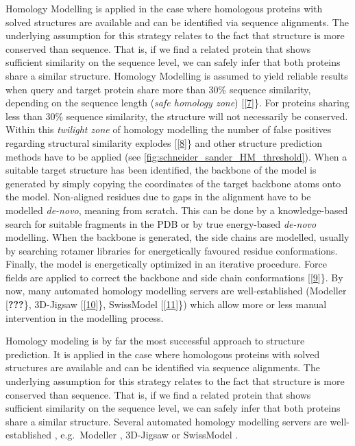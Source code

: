 \documentclass[12pt,a4paper,twoside]{book}
\theoremstyle{definition}
\theoremstyle{definition}
\theoremstyle{remark}
\begin{document}
Homology Modelling is applied in the case where homologous proteins with
solved structures are available and can be identified via sequence
alignments. The underlying assumption for this strategy relates to the
fact that structure is more conserved than sequence. That is, if we find
a related protein that shows sufficient similarity on the sequence
level, we can safely infer that both proteins share a similar structure.
Homology Modelling is assumed to yield reliable results when query and
target protein share more than 30\% sequence similarity, depending on
the sequence length (\textit{safe homology zone})
{[}{[}\protect\hyperlink{ref-Sander1991}{7}{]}\}. For proteins sharing
less than 30\% sequence similarity, the structure will not necessarily
be conserved. Within this \textit{twilight zone} of homology modelling
the number of false positives regarding structural similarity explodes
{[}{[}\protect\hyperlink{ref-Rost1999}{8}{]}\} and other structure
prediction methods have to be applied (see
\autoref{fig:schneider_sander_HM_threshold}). When a suitable target
structure has been identified, the backbone of the model is generated by
simply copying the coordinates of the target backbone atoms onto the
model. Non-aligned residues due to gaps in the alignment have to be
modelled \textit{de-novo}, meaning from scratch. This can be done by a
knowledge-based search for suitable fragments in the PDB or by true
energy-based \textit{de-novo} modelling. When the backbone is generated,
the side chains are modelled, usually by searching rotamer libraries for
energetically favoured residue conformations. Finally, the model is
energetically optimized in an iterative procedure. Force fields are
applied to correct the backbone and side chain conformations
{[}{[}\protect\hyperlink{ref-Gu2009}{9}{]}\}. By now, many automated
homology modelling servers are well-established (Modeller
{[}\textbf{???}\}, 3D-Jigsaw
{[}{[}\protect\hyperlink{ref-Bates2001}{10}{]}\}, SwissModel
{[}{[}\protect\hyperlink{ref-Arnold2006}{11}{]}\}) which allow more or
less manual intervention in the modelling process.

Homology modeling is by far the most successful approach to structure
prediction. It is applied in the case where homologous proteins with
solved structures are available and can be identified via sequence
alignments. The underlying assumption for this strategy relates to the
fact that structure is more conserved than sequence. That is, if we find
a related protein that shows sufficient similarity on the sequence
level, we can safely infer that both proteins share a similar structure.
Several automated homology modelling servers are well-established ,
e.g.~Modeller \citep{Eswar2007}, 3D-Jigsaw \citep{Bates2001} or
SwissModel \citep{Arnold2006}.
\end{document}
